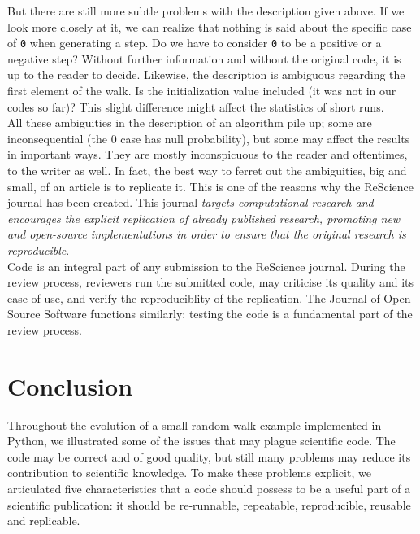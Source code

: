 \documentclass[a4paper,11pt]{article}
\begin{document}
But there are still more subtle problems with the description given above.
If we look more closely at it, we can realize
that nothing is said about the specific case of {\tt 0} when generating a step.
Do we have to consider {\tt 0} to be a positive or a negative step? Without
further information and without the original code, it is up to the reader to
decide. Likewise, the description is ambiguous regarding the first element of the walk. Is the initialization value included (it was not in our codes so far)? This slight difference might affect the statistics of short runs.\\

All these ambiguities in the description of an algorithm pile up; some are inconsequential (the 0 case has null probability), but some may affect the results in important ways. They are mostly inconspicuous to the reader and oftentimes, to the writer as well. In fact, the best way to ferret out the ambiguities, big and small, of an article is to replicate it. This is one of the reasons why the ReScience journal \citep{Rougier:2017} has been created. This journal {\em targets computational research and encourages the explicit replication of already published research, promoting new and open-source implementations in order to ensure that the original research is reproducible}.\\

Code is an integral part of any submission to the ReScience journal. During the review process, reviewers run the submitted code, may criticise its quality and its ease-of-use, and verify the reproduciblity of the replication. The Journal of Open Source Software \citep{Smith:2017} functions similarly: testing the code is a fundamental part of the review process.

\section*{Conclusion}

Throughout the evolution of a small random walk example implemented in Python, we illustrated some of the issues that may plague scientific code. The code may be correct and of good quality, but still many problems may reduce its contribution to scientific knowledge.
To make these problems explicit, we articulated five characteristics that a code should possess to be a useful part of a scientific publication: it should be re-runnable, repeatable, reproducible, reusable and replicable.\\
\end{document}
